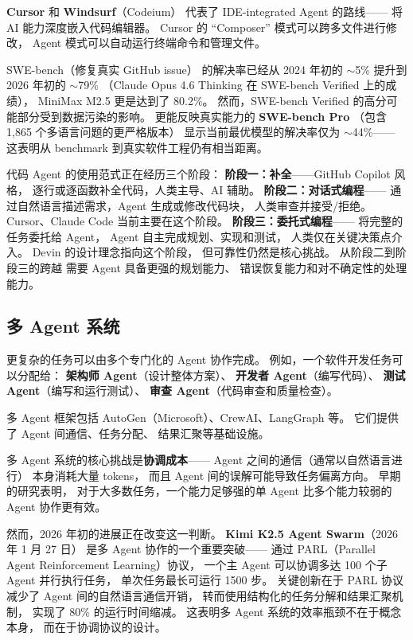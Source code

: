 \textbf{Cursor} 和 \textbf{Windsurf}（Codeium）
代表了 IDE-integrated Agent 的路线——
将 AI 能力深度嵌入代码编辑器。
Cursor 的 ``Composer'' 模式可以跨多文件进行修改，
Agent 模式可以自动运行终端命令和管理文件。

SWE-bench（修复真实 GitHub issue）
的解决率已经从 2024 年初的 $\sim$5\%
提升到 2026 年初的 $\sim$79\%
（Claude Opus 4.6 Thinking 在 SWE-bench Verified 上的成绩），
MiniMax M2.5 更是达到了 80.2\%。
然而，SWE-bench Verified 的高分可能部分受到数据污染的影响。
更能反映真实能力的 \textbf{SWE-bench Pro}
（包含 1,865 个多语言问题的更严格版本）
显示当前最优模型的解决率仅为 $\sim$44\%——
这表明从 benchmark 到真实软件工程仍有相当距离。

\begin{corebox}
代码 Agent 的使用范式正在经历三个阶段：
\textbf{阶段一：补全}——GitHub Copilot 风格，
逐行或逐函数补全代码，人类主导、AI 辅助。
\textbf{阶段二：对话式编程}——
通过自然语言描述需求，Agent 生成或修改代码块，
人类审查并接受/拒绝。Cursor、Claude Code 当前主要在这个阶段。
\textbf{阶段三：委托式编程}——
将完整的任务委托给 Agent，
Agent 自主完成规划、实现和测试，
人类仅在关键决策点介入。
Devin 的设计理念指向这个阶段，
但可靠性仍然是核心挑战。
从阶段二到阶段三的跨越
需要 Agent 具备更强的规划能力、
错误恢复能力和对不确定性的处理能力。
\end{corebox}

\subsection{多 Agent 系统}

更复杂的任务可以由多个专门化的 Agent 协作完成。
例如，一个软件开发任务可以分配给：
\textbf{架构师 Agent}（设计整体方案）、
\textbf{开发者 Agent}（编写代码）、
\textbf{测试 Agent}（编写和运行测试）、
\textbf{审查 Agent}（代码审查和质量检查）。

多 Agent 框架包括
AutoGen（Microsoft）、CrewAI、LangGraph 等。
它们提供了 Agent 间通信、任务分配、
结果汇聚等基础设施。

多 Agent 系统的核心挑战是\textbf{协调成本}——
Agent 之间的通信（通常以自然语言进行）
本身消耗大量 tokens，
而且 Agent 间的误解可能导致任务偏离方向。
早期的研究表明，
对于大多数任务，一个能力足够强的单 Agent
比多个能力较弱的 Agent 协作更有效。

然而，2026 年初的进展正在改变这一判断。
\textbf{Kimi K2.5 Agent Swarm}（2026 年 1 月 27 日）
是多 Agent 协作的一个重要突破——
通过 PARL（Parallel Agent Reinforcement Learning）协议，
一个主 Agent 可以协调多达 100 个子 Agent 并行执行任务，
单次任务最长可运行 1500 步。
关键创新在于 PARL 协议减少了 Agent 间的自然语言通信开销，
转而使用结构化的任务分解和结果汇聚机制，
实现了 80\% 的运行时间缩减。
这表明多 Agent 系统的效率瓶颈不在于概念本身，
而在于协调协议的设计。

